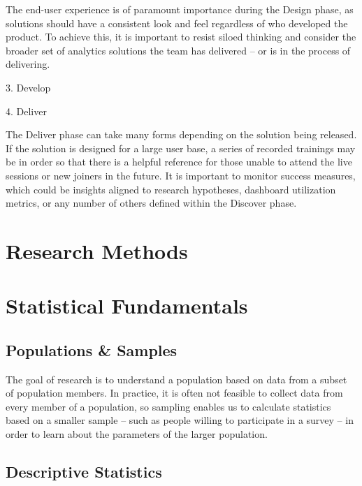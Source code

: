 \documentclass[]{book}
\begin{document}
The end-user experience is of paramount importance during the Design phase, as solutions should have a consistent look and feel regardless of who developed the product. To achieve this, it is important to resist siloed thinking and consider the broader set of analytics solutions the team has delivered -- or is in the process of delivering.

3. Develop

4. Deliver

The Deliver phase can take many forms depending on the solution being released. If the solution is designed for a large user base, a series of recorded trainings may be in order so that there is a helpful reference for those unable to attend the live sessions or new joiners in the future. It is important to monitor success measures, which could be insights aligned to research hypotheses, dashboard utilization metrics, or any number of others defined within the Discover phase.

\hypertarget{research-methods}{%
\chapter{Research Methods}\label{research-methods}}

\hypertarget{statistical-fundamentals}{%
\chapter{Statistical Fundamentals}\label{statistical-fundamentals}}

\hypertarget{populations-samples}{%
\section{Populations \& Samples}\label{populations-samples}}

The goal of research is to understand a population based on data from a subset of population members. In practice, it is often not feasible to collect data from every member of a population, so sampling enables us to calculate statistics based on a smaller sample -- such as people willing to participate in a survey -- in order to learn about the parameters of the larger population.

\hypertarget{descriptive-statistics}{%
\section{Descriptive Statistics}\label{descriptive-statistics}}
\end{document}
